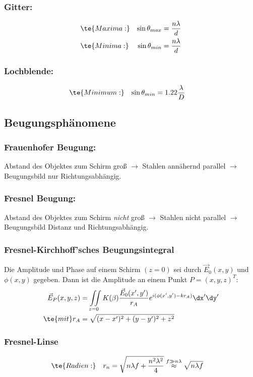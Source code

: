 \documentclass[twocolumn, unnumberedsubsub]{summery}
\begin{document}
\subsubsection{Gitter:}\tight
\begin{align*}
    &\te{Maxima:} & \sin\theta_{max} &=  \frac{n\lambda}{d}\\    
    &\te{Minima:} & \sin\theta_{min} &= \frac{n\lambda}{d}    
\end{align*}

\subsubsection{Lochblende:}\tight
\begin{align*}
    &\te{Minimum:} & \sin\theta_{min} &=  1.22\frac{\lambda}{D}
\end{align*}

\subsection{Beugungsphänomene}
\subsubsection*{Frauenhofer Beugung:}
Abstand des Objektes zum Schirm  gro{\ss} \(\to\) Stahlen annähernd parallel
\(\to\) Beugungsbild nur Richtungsabhängig.

\subsubsection{Fresnel Beugung:}
Abstand des Objektes zum Schirm \emph{nicht} gro{\ss} \(\to\) 
Stahlen nicht parallel \(\to\) Beugungsbild Distanz und Richtungsabhängig.

\subsubsection{Fresnel-Kirchhoff'sches Beugungsintegral}
Die Amplitude und Phase auf einem Schirm \((z=0)\) sei durch \(\vec E_0(x,y)\) 
und \(\phi(x,y)\) gegeben. Dann ist die Amplitude an einem
Punkt $P=(x,y,z)^T$:
\begin{align*}
    \vec E_P(x,y,z) &= \iint\limits_{z=0} K(\beta)\frac{\vec E_0(x',y')}{r_A} 
    e^{i(\phi(x',y') - k r_A)} \dx'\dy'\\
    \te{mit } r_A &= \sqrt{(x-x')^2 + (y-y')^2 + z^2}
\end{align*}

\subsubsection{Fresnel-Linse}\tight
\begin{align*}
        &\te{Radien:}  & r_n &= 
        \sqrt{n\lambda f + \frac{n^2\lambda^2}4} \overset{f\gg n\lambda}{\approx} \sqrt{n\lambda f}
\end{align*}
\end{document}
